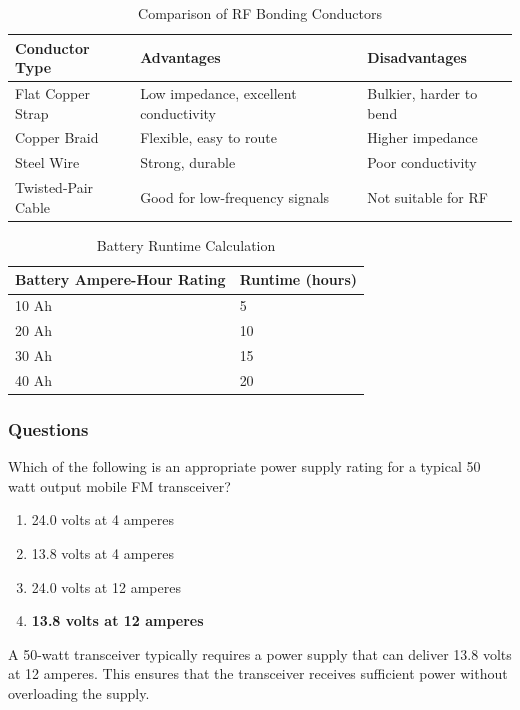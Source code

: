 \begin{table}[h!]
    \centering
    \begin{tabular}{|l|l|l|}
        \hline
        \textbf{Conductor Type} & \textbf{Advantages} & \textbf{Disadvantages} \\
        \hline
        Flat Copper Strap & Low impedance, excellent conductivity & Bulkier, harder to bend \\
        Copper Braid & Flexible, easy to route & Higher impedance \\
        Steel Wire & Strong, durable & Poor conductivity \\
        Twisted-Pair Cable & Good for low-frequency signals & Not suitable for RF \\
        \hline
    \end{tabular}
    \caption{Comparison of RF Bonding Conductors}
    \label{tab:rf-bonding-conductors}
\end{table}

\begin{table}[h!]
    \centering
    \begin{tabular}{|l|l|}
        \hline
        \textbf{Battery Ampere-Hour Rating} & \textbf{Runtime (hours)} \\
        \hline
        10 Ah & 5 \\
        20 Ah & 10 \\
        30 Ah & 15 \\
        40 Ah & 20 \\
        \hline
    \end{tabular}
    \caption{Battery Runtime Calculation}
    \label{tab:battery-runtime-calculation}
\end{table}



\subsubsection{Questions}

\begin{tcolorbox}[colback=gray!10!white,colframe=black!75!black,title={T4A01}]
    Which of the following is an appropriate power supply rating for a typical 50 watt output mobile FM transceiver?
    \begin{enumerate}[label=\Alph*),noitemsep]
        \item 24.0 volts at 4 amperes
        \item 13.8 volts at 4 amperes
        \item 24.0 volts at 12 amperes
        \item \textbf{13.8 volts at 12 amperes}
    \end{enumerate}
\end{tcolorbox}
A 50-watt transceiver typically requires a power supply that can deliver 13.8 volts at 12 amperes. This ensures that the transceiver receives sufficient power without overloading the supply.

